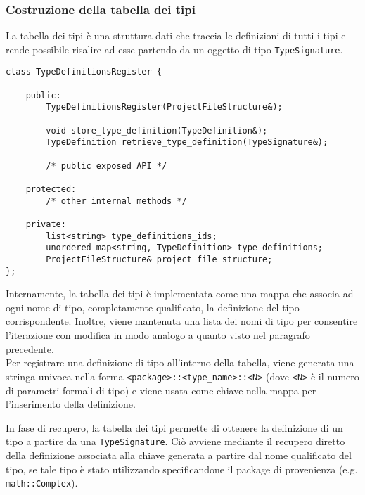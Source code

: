 \subsubsection{Costruzione della tabella dei tipi}
La tabella dei tipi è una struttura dati che traccia le definizioni di tutti i tipi
e rende possibile risalire ad esse partendo da un oggetto di tipo \texttt{TypeSignature}. \\

\vspace{0.5cm}
\begin{lstlisting}[frame=single]
class TypeDefinitionsRegister {

    public:
        TypeDefinitionsRegister(ProjectFileStructure&);

        void store_type_definition(TypeDefinition&);
        TypeDefinition retrieve_type_definition(TypeSignature&);

        /* public exposed API */

    protected:
        /* other internal methods */

    private:
        list<string> type_definitions_ids;
        unordered_map<string, TypeDefinition> type_definitions;
        ProjectFileStructure& project_file_structure;
};
\end{lstlisting}
\vspace{0.5cm}

Internamente, la tabella dei tipi è implementata come una mappa che associa ad ogni
nome di tipo, completamente qualificato, la definizione del tipo corrispondente. Inoltre, viene mantenuta una 
lista dei nomi di tipo per consentire l'iterazione con modifica in modo analogo a quanto visto nel paragrafo precedente. \\

Per registrare una definizione di tipo all'interno della tabella, viene generata una stringa 
univoca nella forma \texttt{<package>::<type\_name>::<N>} (dove \texttt{<N>} è il numero di parametri formali di tipo)
e viene usata come chiave nella mappa per l'inserimento della definizione.

In fase di recupero, la tabella dei tipi permette di ottenere la definizione di un tipo a partire da una \texttt{TypeSignature}.
Ciò avviene mediante il recupero diretto della definizione associata alla chiave generata a partire dal nome qualificato del tipo, 
se tale tipo è stato utilizzando specificandone il package di provenienza (e.g. \texttt{math::Complex}). \\


